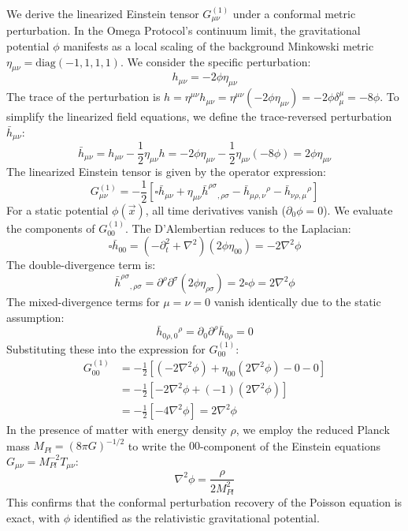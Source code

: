 \documentclass[11pt,template]{article}
\newcommand{\MPl}{M_{Pl}}
\begin{document}
We derive the linearized Einstein tensor $G_{\mu\nu}^{(1)}$ under a conformal metric perturbation. In the Omega Protocol's continuum limit, the gravitational potential $\phi$ manifests as a local scaling of the background Minkowski metric $\eta_{\mu\nu} = \text{diag}(-1, 1, 1, 1)$. We consider the specific perturbation:
\begin{equation}
    h_{\mu\nu} = -2\phi \eta_{\mu\nu}
\end{equation}
The trace of the perturbation is $h = \eta^{\mu\nu} h_{\mu\nu} = \eta^{\mu\nu} (-2\phi \eta_{\mu\nu}) = -2\phi \delta^\mu_\mu = -8\phi$. To simplify the linearized field equations, we define the trace-reversed perturbation $\bar{h}_{\mu\nu}$:
\begin{equation}
    \bar{h}_{\mu\nu} = h_{\mu\nu} - \frac{1}{2} \eta_{\mu\nu} h = -2\phi \eta_{\mu\nu} - \frac{1}{2} \eta_{\mu\nu} (-8\phi) = 2\phi \eta_{\mu\nu}
\end{equation}
The linearized Einstein tensor is given by the operator expression:
\begin{equation}
    G_{\mu\nu}^{(1)} = -\frac{1}{2} \left[ \square \bar{h}_{\mu\nu} + \eta_{\mu\nu} \bar{h}^{\rho\sigma}{}_{,\rho\sigma} - \bar{h}_{\mu\rho,\nu}{}^{\rho} - \bar{h}_{\nu\rho,\mu}{}^{\rho} \right]
\end{equation}
For a static potential $\phi(\vec{x})$, all time derivatives vanish ($\partial_0 \phi = 0$). We evaluate the components of $G_{00}^{(1)}$. The D'Alembertian reduces to the Laplacian:
\begin{equation}
    \square \bar{h}_{00} = (-\partial_t^2 + \nabla^2) (2\phi \eta_{00}) = -2\nabla^2\phi
\end{equation}
The double-divergence term is:
\begin{equation}
    \bar{h}^{\rho\sigma}{}_{,\rho\sigma} = \partial^\rho \partial^\sigma (2\phi \eta_{\rho\sigma}) = 2 \square \phi = 2\nabla^2\phi
\end{equation}
The mixed-divergence terms for $\mu=\nu=0$ vanish identically due to the static assumption:
\begin{equation}
    \bar{h}_{0\rho,0}{}^{\rho} = \partial_0 \partial^\rho \bar{h}_{0\rho} = 0
\end{equation}
Substituting these into the expression for $G_{00}^{(1)}$:
\begin{align}
    G_{00}^{(1)} &= -\frac{1}{2} \left[ (-2\nabla^2\phi) + \eta_{00} (2\nabla^2\phi) - 0 - 0 \right] \\
    &= -\frac{1}{2} \left[ -2\nabla^2\phi + (-1)(2\nabla^2\phi) \right] \\
    &= -\frac{1}{2} \left[ -4\nabla^2\phi \right] = 2\nabla^2\phi
\end{align}
In the presence of matter with energy density $\rho$, we employ the reduced Planck mass $\MPl = (8\pi G)^{-1/2}$ to write the $00$-component of the Einstein equations $G_{\mu\nu} = \MPl^{-2} T_{\mu\nu}$:
\begin{equation}
    \nabla^2\phi = \frac{\rho}{2\MPl^2}
\end{equation}
This confirms that the conformal perturbation recovery of the Poisson equation is exact, with $\phi$ identified as the relativistic gravitational potential.
\end{document}
